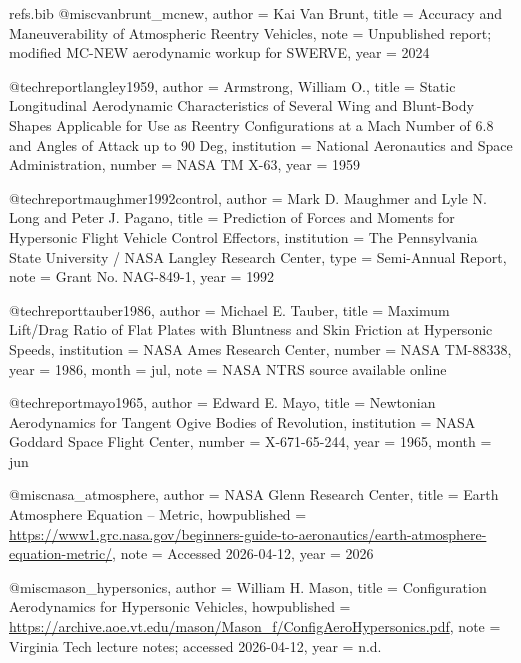 \begin{filecontents*}{refs.bib}
@misc{vanbrunt_mcnew,
  author       = {Kai Van Brunt},
  title        = {Accuracy and Maneuverability of Atmospheric Reentry Vehicles},
  note         = {Unpublished report; modified MC-NEW aerodynamic workup for SWERVE},
  year         = {2024}
}

@techreport{langley1959,
  author       = {Armstrong, William O.},
  title        = {Static Longitudinal Aerodynamic Characteristics of Several Wing and Blunt-Body Shapes Applicable for Use as Reentry Configurations at a Mach Number of 6.8 and Angles of Attack up to 90 Deg},
  institution  = {National Aeronautics and Space Administration},
  number       = {NASA TM X-63},
  year         = {1959}
}

@techreport{maughmer1992control,
  author       = {Mark D. Maughmer and Lyle N. Long and Peter J. Pagano},
  title        = {Prediction of Forces and Moments for Hypersonic Flight Vehicle Control Effectors},
  institution  = {The Pennsylvania State University / NASA Langley Research Center},
  type         = {Semi-Annual Report},
  note         = {Grant No. NAG-849-1},
  year         = {1992}
}

@techreport{tauber1986,
  author       = {Michael E. Tauber},
  title        = {Maximum Lift/Drag Ratio of Flat Plates with Bluntness and Skin Friction at Hypersonic Speeds},
  institution  = {NASA Ames Research Center},
  number       = {NASA TM-88338},
  year         = {1986},
  month        = jul,
  note         = {NASA NTRS source available online}
}

@techreport{mayo1965,
  author       = {Edward E. Mayo},
  title        = {Newtonian Aerodynamics for Tangent Ogive Bodies of Revolution},
  institution  = {NASA Goddard Space Flight Center},
  number       = {X-671-65-244},
  year         = {1965},
  month        = jun
}

@misc{nasa_atmosphere,
  author       = {{NASA Glenn Research Center}},
  title        = {Earth Atmosphere Equation -- Metric},
  howpublished = {\url{https://www1.grc.nasa.gov/beginners-guide-to-aeronautics/earth-atmosphere-equation-metric/}},
  note         = {Accessed 2026-04-12},
  year         = {2026}
}

@misc{mason_hypersonics,
  author       = {William H. Mason},
  title        = {Configuration Aerodynamics for Hypersonic Vehicles},
  howpublished = {\url{https://archive.aoe.vt.edu/mason/Mason_f/ConfigAeroHypersonics.pdf}},
  note         = {Virginia Tech lecture notes; accessed 2026-04-12},
  year         = {n.d.}
}


\end{filecontents*}
